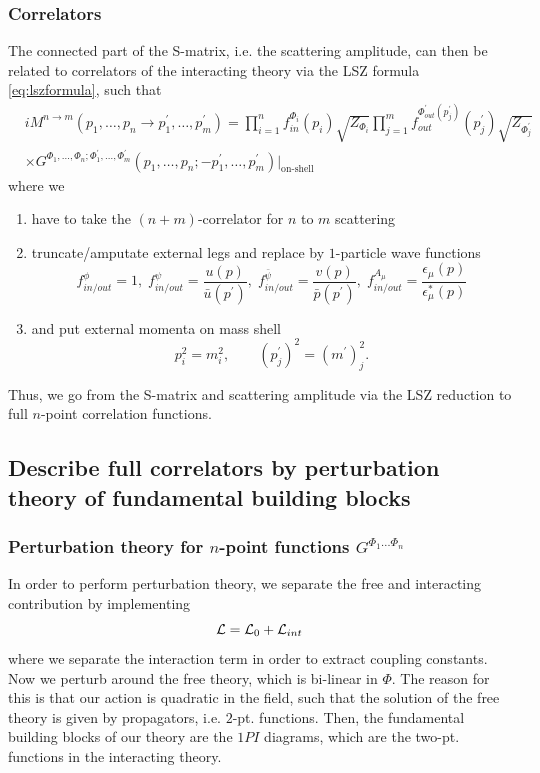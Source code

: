 \subsubsection{Correlators}
The connected part of the S-matrix, i.e. the scattering amplitude, can then be related to correlators of the interacting theory via the LSZ formula \ref{eq:lszformula}, such that
\begin{align}
	&i M^{n\rightarrow m} (p_1,\dots,p_n \rightarrow p^\prime_1,\dots,p^\prime_m) = \prod_{i=1}^{n}  f^{\Phi_i}_{in}(p_i) \sqrt{Z_{\Phi_i}} \prod_{j=1}^m f^{\Phi^\prime_{out}(p^\prime_j)}_{out}(p^\prime_j) \sqrt{Z_{\Phi^\prime_j}} \\
	&\times G^{\Phi_1,\dots,\Phi_n; \Phi^\prime_1,\dots,\Phi^\prime_m}(p_1,\dots,p_n;-p^\prime_1,\dots,p^\prime_m) |_{\text{on-shell}} 
\end{align}
where we 
\begin{enumerate}
	\item have to take the $(n+m)$-correlator for $n$ to $m$ scattering
	\item truncate/amputate external legs and replace by $1$-particle wave functions
	\begin{equation}
		f^\phi_{in/out} = 1,\; f^{\psi}_{in/out} = \frac{u(p)}{\bar{u}(p^\prime)}, \; f^{\bar{ \psi}}_{in/out} = \frac{v(p)}{\bar{p}(p^\prime)}, \; f^{A_\mu}_{in/out} = \frac{\epsilon_{\mu}(p)}{\epsilon^*_\mu(p)}
	\end{equation}
	\item and put external momenta on mass shell
	\begin{equation*}
		p^2_i=m^2_i,\qquad (p^\prime_j)^2= (m^\prime)^2_j. 
	\end{equation*}
\end{enumerate}
Thus, we go from the S-matrix and scattering amplitude via the LSZ reduction to full $n$-point correlation functions.


\subsection{Describe full correlators by perturbation theory of fundamental building blocks}



\subsubsection{Perturbation theory for $n$-point functions $G^{\Phi_1\dots \Phi_n}$}
In order to perform perturbation theory, we separate the free and interacting contribution by implementing
\begin{equation*}
	\mathcal{L} = \mathcal{L}_0+\mathcal{L}_{int}
\end{equation*}
where we separate the interaction term in order to extract coupling constants. Now we perturb around the free theory, which is bi-linear in $\Phi$. The reason for this is that our action is quadratic in the field, such that the solution of the free theory is given by propagators, i.e. $2$-pt. functions. Then, the fundamental building blocks of our theory are the $1PI$ diagrams, which are the two-pt. functions in the interacting theory.


